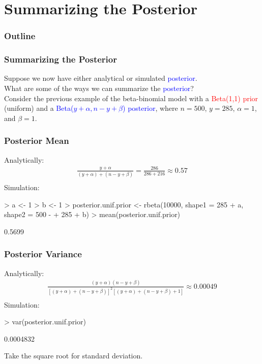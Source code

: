 \documentclass{beamer}
\begin{document}
\section{Summarizing the Posterior}

\begin{frame}
\frametitle{Outline}
\tableofcontents[currentsection]
\end{frame}

\begin{frame}
\frametitle{Summarizing the Posterior}
\pause
Suppose we now have either analytical or simulated \textcolor{blue}{posterior}.  \\
\pause
\bigskip
What are some of the ways we can summarize the \textcolor{blue}{posterior}? \\
\pause
\bigskip
Consider the previous example of the beta-binomial model with a
\textcolor{red}{Beta(1,1) prior} (uniform) and a
\textcolor{blue}{Beta($y+\alpha, n-y+\beta$) posterior}, where $n=500$,
$y = 285$, $\alpha = 1$, and $\beta = 1$.
\end{frame}

\begin{frame}[fragile]
\frametitle{Posterior Mean}
\pause
Analytically:
\begin{eqnarray*}
\frac{y+\alpha}{(y+\alpha) + (n-y+\beta)} = \frac{286}{286+216}
\approx 0.57\\
\end{eqnarray*}
\pause
\bigskip
Simulation:
\tiny
\begin{Schunk}
\begin{Sinput}
> a <- 1
> b <- 1
> posterior.unif.prior <- rbeta(10000, shape1 = 285 + a, shape2 = 500 - 
+     285 + b)
> mean(posterior.unif.prior)
\end{Sinput}
\begin{Soutput}
[1] 0.5699
\end{Soutput}
\end{Schunk}
\normalsize
\end{frame}

\begin{frame}[fragile]
\frametitle{Posterior Variance}
\pause
Analytically:
\begin{eqnarray*}
\frac{(y+\alpha)(n-y+\beta)}{[(y+\alpha) + (n-y+\beta)]^2 [(y+\alpha)
+ (n-y+\beta) + 1]} %
\approx  0.00049\\
\end{eqnarray*}
\pause
\bigskip
Simulation:
\tiny
\begin{Schunk}
\begin{Sinput}
> var(posterior.unif.prior)
\end{Sinput}
\begin{Soutput}
[1] 0.0004832
\end{Soutput}
\end{Schunk}
\normalsize
\pause
Take the square root for standard deviation.
\end{frame}
\end{document}
